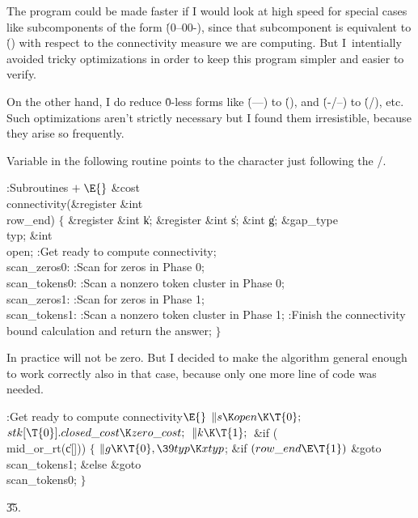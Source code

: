 The program could be made faster if I would look at high speed for
special cases like subcomponents of the form \.{(0--00-)}, since
that subcomponent is equivalent to \.{()} with respect to the
connectivity measure we are computing. But I~intentially avoided tricky
optimizations in order to keep this program simpler and easier to verify.

On the other hand, I do
reduce \.0-less forms like \.{(---)} to \.{()},
and \.{(-\caret/--)} to \.{(\caret/)}, etc.
Such optimizations aren't strictly necessary but I found them irresistible,
because they arise so frequently.

Variable  in the following routine points to the character
just
following the \qcaret/.

\Y\B\4:Subroutines\X${}\mathrel+\E{}$\6
\&{cost} \\{connectivity}(\&{register} \&{int} \\{row\_end})\1\1\2\2\6
${}\{{}$\1\6
\&{register} \&{int} \|k;\6
\&{register} \&{int} \|s;\6
\&{int} \|g;\6
\&{gap\_type} \\{typ};\6
\&{int} \\{open};\7
:Get ready to compute connectivity\X;\6
\4\\{scan\_zeros0}:\5
:Scan for zeros in Phase 0\X;\6
\4\\{scan\_tokens0}:\5
:Scan a nonzero token cluster in Phase 0\X;\6
\4\\{scan\_zeros1}:\5
:Scan for zeros in Phase 1\X;\6
\4\\{scan\_tokens1}:\5
:Scan a nonzero token cluster in Phase 1\X;\6
:Finish the connectivity bound calculation and return the answer\X;\6
\4${}\}{}$\2\par
\fi

In practice  will not be zero. But I decided to make the
algorithm
general enough to work correctly also in that case, because only one more
line of code was needed.

\Y\B\4:Get ready to compute connectivity\X${}\E{}$\6
$\|s\K\\{open}\K\T{0};{}$\6
${}\\{stk}[\T{0}].\\{closed\_cost}\K\\{zero\_cost};{}$\6
${}\|k\K\T{1};{}$\6
\&{if} (\\{mid\_or\_rt}(\|c[]))\5
${}\{{}$\1\6
${}\|g\K\T{0},\39\\{typ}\K\\{xtyp}{}$;\6
\&{if} ${}(\\{row\_end}\E\T{1}){}$\1\5
\&{goto} \\{scan\_tokens1};\2\6
\&{else}\1\5
\&{goto} \\{scan\_tokens0};\2\6
\4${}\}{}$\2\par
\U35.\fi

